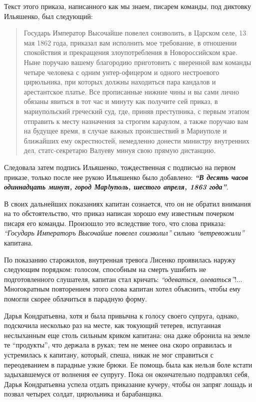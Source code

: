 \documentclass[a4paper,20pt]{article}
\begin{document}
Текст этого приказа, написанного как мы знаем, писарем
команды, под диктовку Ильяшенко, был следующий: 

\begin{quote}
\em\bfseries

Государь Император Высочайше повелел соизволить, в Царском селе, 13 мая 1862
года, приказал вам исполнить мое требование, в отношении спокойствия и
прекращения злоупотребления в Новороссийском крае. Ныне поручаю вашему
благородию приготовить с вверенной вам команды четыре человека с одним
унтер-офицером и одного нестроевого цирюльника, при которых должны
находиться пара кандалов и арестантское платье. Все прописанные нижние
чины и вы сами лично обязаны явиться в тот час и минуту как получите
сей приказ, в мариупольский греческий суд, где, приняв преступника, с
первым этапом отправить к месту назначения за строгим караулом, а также
поручаю вам на будущее время, в случае важных происшествий в Мариуполе
и ближайших ему окрестностей, немедленно донести министру внутренних
дел, статс-секретарю Валуеву минуя свою прямую дистанцию.
	
\end{quote}
Следовала
затем подпись Ильяшенко, тождественная с подписью на
первом приказе, только после нее рукою Ильяшенко было
добавлено: \textbf{\em ``В десять часов одиннадцать минут, город
Марbуполь, шестого апреля, 1863 года''}.

В своих дальнейших показаниях капитан сознается, 
что он не обратил внимания на то обстоятельство,
что приказ написан хорошо ему известным почерком
писаря его команды. Произошло это вследствие того, что
слова приказа: \emph{``Государь Императоръ Высочайше повелел
соизволил''} сильно \emph{``ветревожили''} капитана.

По показанию старожилов, внутренная тревога Лисенко
проявилась наружу следующим порядком: голосом, способным на смерть ушибить 
не подготовленного слушателя,
капитан стал кричать: \emph{``одеваться, олеваться''}!... Многократным
повторением этого слова капитан хотел объяснить, 
чтобы ему помогли скорее облачиться в парадную форму.

Дарья Кондратьевна, хотя и была привычна к голосу своего супруга, однако,
подскочила несколько раз на месте, как токующий тетерев, испуганная неслыханным
еще столь сильным криком капитана: она даже обронила на земле те ``продукты'',
что держала в руках; тем не менее она скоро оправилась и устремилась к
капитану, который, спеша, никак не мог справиться с переодеванием в парадные
узкие брюки.  Ее помощь была как нельзя боле кстати задыхавшемуся от волнения
ее супругу.  Пока он окончательно подправлял себя, Дарья Кондратьевна успела
отдать приказание кучеру, чтобы он запряг лошадь и позвал четырех солдат,
цирюльника и барабанщика.
\end{document}
